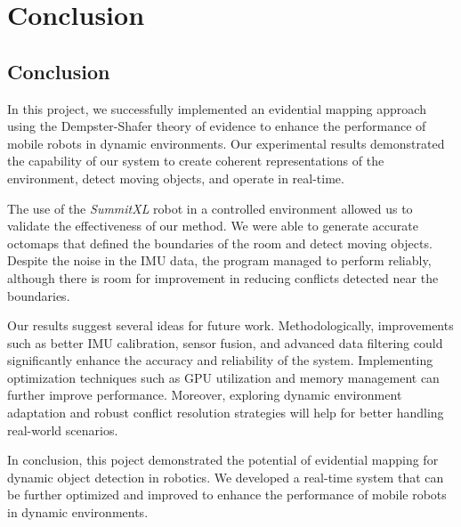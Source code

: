 \chapter{Conclusion}

\section*{Conclusion}

In this project, we successfully implemented an evidential mapping approach using the Dempster-Shafer theory of evidence to enhance the performance of mobile robots in dynamic environments. Our experimental results demonstrated the capability of our system to create coherent representations of the environment, detect moving objects, and operate in real-time.

The use of the \textit{SummitXL} robot in a controlled environment allowed us to validate the effectiveness of our method. We were able to generate accurate octomaps that defined the boundaries of the room and detect moving objects. Despite the noise in the IMU data, the program managed to perform reliably, although there is room for improvement in reducing conflicts detected near the boundaries.

Our results suggest several ideas for future work. Methodologically, improvements such as better IMU calibration, sensor fusion, and advanced data filtering could significantly enhance the accuracy and reliability of the system. Implementing optimization techniques such as GPU utilization and memory management can further improve performance. Moreover, exploring dynamic environment adaptation and robust conflict resolution strategies will help for better handling real-world scenarios.

In conclusion, this poject demonstrated the potential of evidential mapping for dynamic object detection in robotics. We developed a real-time system that can be further optimized and improved to enhance the performance of mobile robots in dynamic environments.

